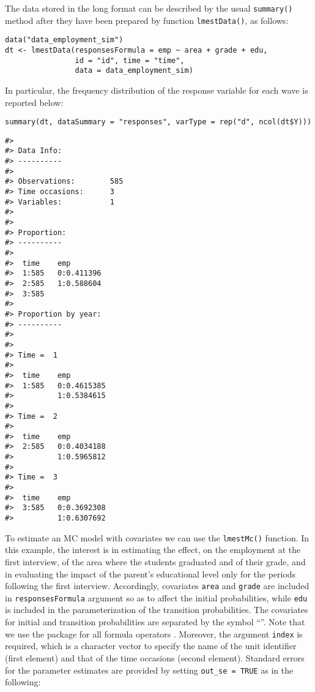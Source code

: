 The data stored in the long format can be described by the usual
\texttt{summary()} method after they have been prepared by function
\texttt{lmestData()}, as follows:

\begin{verbatim}
data("data_employment_sim")
dt <- lmestData(responsesFormula = emp ~ area + grade + edu,          
                id = "id", time = "time", 
                data = data_employment_sim)
\end{verbatim}

In particular, the frequency distribution of the response variable for
each wave is reported below:

\begin{verbatim}
summary(dt, dataSummary = "responses", varType = rep("d", ncol(dt$Y)))
\end{verbatim}

\begin{verbatim}
#> 
#> Data Info:
#> ---------- 
#> 
#> Observations:        585 
#> Time occasions:      3 
#> Variables:           1 
#> 
#> 
#> Proportion:
#> ---------- 
#> 
#>  time    emp       
#>  1:585   0:0.411396
#>  2:585   1:0.588604
#>  3:585             
#> 
#> Proportion by year:
#> ---------- 
#> 
#> 
#> Time =  1 
#> 
#>  time    emp        
#>  1:585   0:0.4615385
#>          1:0.5384615
#> 
#> Time =  2 
#> 
#>  time    emp        
#>  2:585   0:0.4034188
#>          1:0.5965812
#> 
#> Time =  3 
#> 
#>  time    emp        
#>  3:585   0:0.3692308
#>          1:0.6307692
\end{verbatim}

To estimate an MC model with covariates we can use the \texttt{lmestMc()}
function. In this example, the interest is in estimating the effect, on
the employment at the first interview, of the area where the students
graduated and of their grade, and in evaluating the impact of the
parent's educational level only for the periods following the first
interview. Accordingly, covariates \texttt{area} and \texttt{grade} are included in
\texttt{responsesFormula} argument so as to affect the initial probabilities,
while \texttt{edu} is included in the parameterization of the transition
probabilities. The covariates for initial and transition probabilities
are separated by the symbol ``\texttt{\textbar{}}''. Note that we use the
 package for all formula operators
\citep{zeil:croi:10}. Moreover, the argument \texttt{index} is required, which
is a character vector to specify the name of the unit identifier (first
element) and that of the time occasions (second element). Standard
errors for the parameter estimates are provided by setting
\texttt{out\_se\ =\ TRUE} as in the following:

